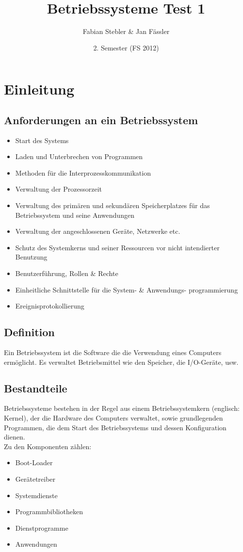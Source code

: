 \documentclass[a4paper, 10pt]{article}
\title{Betriebssysteme Test 1}
\author{Fabian Stebler \& Jan F\"assler}
\date{2. Semester (FS 2012)}
\begin{document}
\maketitle
\thispagestyle{fancy}

\newpage


\tableofcontents	  	


\newpage
\setcounter{page}{1}
\section{Einleitung}

\subsection{Anforderungen an ein Betriebssystem}
\begin{itemize}
	\item Start des Systems
	\item Laden und Unterbrechen von Programmen
	\item Methoden für die Interprozesskommunikation
	\item Verwaltung der Prozessorzeit
	\item Verwaltung des primären und sekundären Speicherplatzes für das Betriebssystem und seine Anwendungen
	\item Verwaltung der angeschlossenen Geräte, Netzwerke etc.
	\item Schutz des Systemkerns und seiner Ressourcen vor nicht intendierter Benutzung
	\item Benutzerführung, Rollen \& Rechte	
	\item Einheitliche Schnittstelle für die System- \& Anwendungs- programmierung
	\item Ereignisprotokollierung
\end{itemize}
\subsection{Definition}
Ein Betriebssystem ist die Software die die Verwendung eines Computers erm\"oglicht. Es verwaltet Betriebsmittel wie den Speicher, die I/O-Ger\"ate, usw.
\subsection{Bestandteile}
Betriebssysteme bestehen in der Regel aus einem Betriebssystemkern (englisch: Kernel), der die Hardware des Computers verwaltet, sowie grundlegenden Programmen, die dem Start des Betriebssystems und dessen Konfiguration dienen.\\
Zu den Komponenten z\"ahlen:
\begin{itemize}
\item Boot-Loader
\item Ger\"atetreiber
\item Systemdienste
\item Programmbibliotheken
\item Dienstprogramme
\item Anwendungen
\end{itemize}
\end{document}
